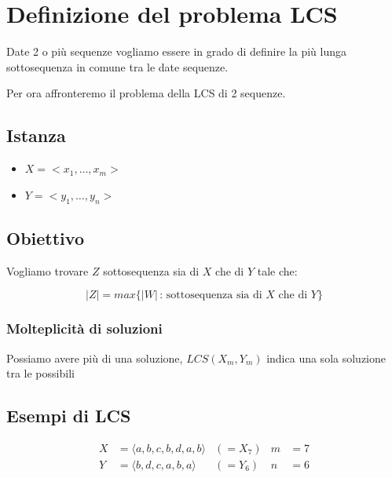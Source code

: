 \section{Definizione del problema LCS}
Date 2 o più sequenze vogliamo essere in grado di definire la più lunga sottosequenza in comune tra le date sequenze.

Per ora affronteremo il problema della LCS di 2 sequenze.

\subsection{Istanza}
\begin{itemize}
    \item $X= <x_1, \dots , x_m>$
    \item $Y = <y_1, \dots, y_n>$
\end{itemize}

\subsection{Obiettivo}
Vogliamo trovare $Z$ sottosequenza sia di $X$ che di $Y$ tale che:

$$
    |Z| = max\{|W|\, :\, \text{sottosequenza sia di } X \text{ che di } Y\}
$$

\subsubsection{Molteplicità di soluzioni}
Possiamo avere più di una soluzione, $LCS(X_m, Y_m)$ indica una sola soluzione tra le possibili

\subsection{Esempi di LCS}
\begin{align*}
X &= \langle a, b, c, b, d, a, b \rangle & (= X_7) & m &= 7 \\
Y &= \langle b, d, c, a, b, a \rangle & (= Y_6) & n &= 6
\end{align*}

\vspace{0.5cm}


